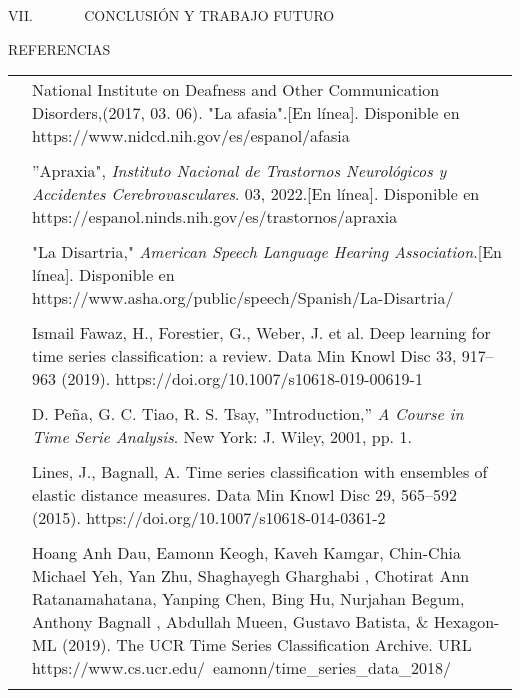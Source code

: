 \documentclass[10pt]{article}
\begin{document}
\begin{multicols}{2}
		\hfill\break
		\centering
		VII. ~~~~~~ CONCLUSIÓN Y TRABAJO FUTURO
		
		
		
		\hfill\break
		\justifying
		
		\hfill\break
		\newpage
		\centering
		REFERENCIAS
		
		\begin{tabular}{p{0.5cm} p{7cm}}
			\text{[1]} & National Institute on Deafness and Other Communication Disorders,(2017, 03. 06). "La afasia".[En línea]. Disponible en https://www.nidcd.nih.gov/es/espanol/afasia \\ \\
			
			\text{[2]} & ''Apraxia", \textit{Instituto Nacional de Trastornos Neurológicos y Accidentes Cerebrovasculares}. 03, 2022.[En línea]. Disponible en https://espanol.ninds.nih.gov/es/trastornos/apraxia \\ \\
			
			\text{[3]} & "La Disartria," \textit{American Speech Language Hearing Association}.[En línea]. Disponible en https://www.asha.org/public/speech/Spanish/La-Disartria/ \\ \\
			
			\text{[4]} & Ismail Fawaz, H., Forestier, G., Weber, J. et al. Deep learning for time series classification: a review. Data Min Knowl Disc 33, 917–963 (2019). https://doi.org/10.1007/s10618-019-00619-1 \\ \\
			
			\text{[5]} & D. Peña, G. C. Tiao, R. S. Tsay, ''Introduction,'' \textit{A Course in Time Serie Analysis}. New York: J. Wiley, 2001, pp. 1. \\ \\
			
			\text{[6]} & Lines, J., Bagnall, A. Time series classification with ensembles of elastic distance measures. Data Min Knowl Disc 29, 565–592 (2015). https://doi.org/10.1007/s10618-014-0361-2 \\ \\
			
			\text{[7]} & Hoang Anh Dau, Eamonn Keogh, Kaveh Kamgar, Chin-Chia Michael Yeh, Yan Zhu, Shaghayegh Gharghabi , Chotirat Ann Ratanamahatana, Yanping Chen, Bing Hu, Nurjahan Begum, Anthony Bagnall , Abdullah Mueen, Gustavo Batista, \& Hexagon-ML (2019). The UCR Time Series Classification Archive. URL https://www.cs.ucr.edu/~eamonn/time\_series\_data\_2018/ \\ \\
			

\end{tabular}
\end{multicols}
\end{document}
